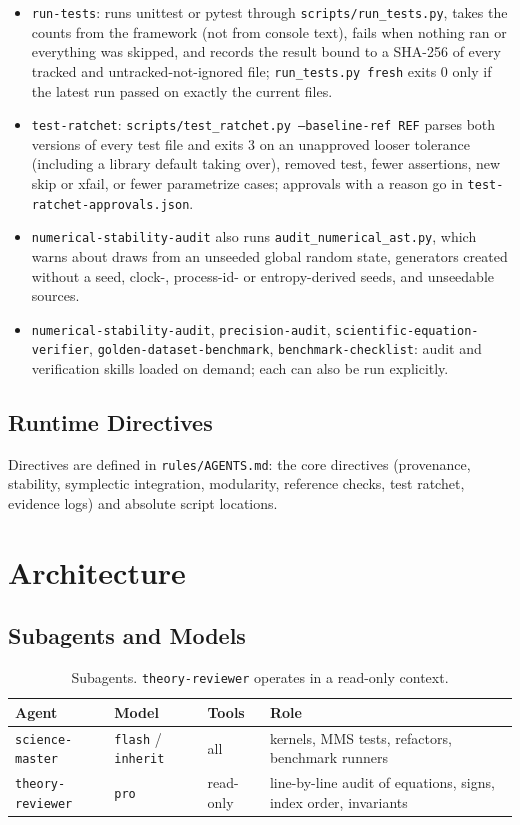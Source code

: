 \documentclass[11pt,a4paper]{report}
\begin{document}
\begin{itemize}[itemsep=2pt]
    \item \texttt{run-tests}: runs unittest or pytest through \texttt{scripts/run\_tests.py}, takes the counts from the framework (not from console text), fails when nothing ran or everything was skipped, and records the result bound to a SHA-256 of every tracked and untracked-not-ignored file; \texttt{run\_tests.py fresh} exits 0 only if the latest run passed on exactly the current files.
    \item \texttt{test-ratchet}: \texttt{scripts/test\_ratchet.py --baseline-ref REF} parses both versions of every test file and exits 3 on an unapproved looser tolerance (including a library default taking over), removed test, fewer assertions, new skip or xfail, or fewer parametrize cases; approvals with a reason go in \texttt{test-ratchet-approvals.json}.
    \item \texttt{numerical-stability-audit} also runs \texttt{audit\_numerical\_ast.py}, which warns about draws from an unseeded global random state, generators created without a seed, clock-, process-id- or entropy-derived seeds, and unseedable sources.
    \item \texttt{numerical-stability-audit}, \texttt{precision-audit}, \texttt{scientific-equation-verifier}, \texttt{golden-dataset-benchmark}, \texttt{benchmark-checklist}: audit and verification skills loaded on demand; each can also be run explicitly.
\end{itemize}

\section{Runtime Directives}
Directives are defined in \texttt{rules/AGENTS.md}: the core directives (provenance, stability, symplectic integration, modularity, reference checks, test ratchet, evidence logs) and absolute script locations.

\chapter{Architecture}

\section{Subagents and Models}
\begin{table}[h]
\centering
\small
\begin{tabular}{llll}
\toprule
\textbf{Agent} & \textbf{Model} & \textbf{Tools} & \textbf{Role} \\
\midrule
\texttt{science-master} & \texttt{flash} / \texttt{inherit} & all & kernels, MMS tests, refactors, benchmark runners \\
\texttt{theory-reviewer} & \texttt{pro} & read-only & line-by-line audit of equations, signs, index order, invariants \\
\bottomrule
\end{tabular}
\caption{Subagents. \texttt{theory-reviewer} operates in a read-only context.}
\end{table}
\end{document}
